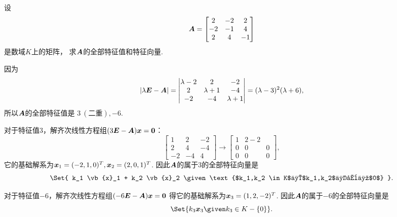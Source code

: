 \begin{example}
设\[
	\boldsymbol{A} = \begin{bmatrix}
		2 & -2 & 2 \\
		-2 & -1 & 4 \\
		2 & 4 & -1
	\end{bmatrix}
\]是数域\(K\)上的矩阵，
求\(\boldsymbol{A}\)的全部特征值和特征向量.
\begin{solution}
因为\[
	\abs{\lambda\boldsymbol{E}-\boldsymbol{A}}
	= \begin{vmatrix}
		\lambda-2 & 2 & -2 \\
		2 & \lambda+1 & -4 \\
		-2 & -4 & \lambda+1
	\end{vmatrix}
	= (\lambda-3)^2 (\lambda+6),
\]
所以\(\boldsymbol{A}\)的全部特征值是
\(3\ (\text{二重}),-6\).

对于特征值\(3\)，解齐次线性方程组\((3\boldsymbol{E}-\boldsymbol{A}) \boldsymbol{x} = \boldsymbol0\)：\[
	\begin{bmatrix}
		1 & 2 & -2 \\
		2 & 4 & -4 \\
		-2 & -4 & 4
	\end{bmatrix}
	\to \begin{bmatrix}
		1 & 2 -2 \\
		0 & 0 & 0 \\
		0 & 0 & 0
	\end{bmatrix},
\]
它的基础解系为\(\boldsymbol{x}_1 = (-2,1,0)^T,
\boldsymbol{x}_2 = (2,0,1)^T\).
因此\(\boldsymbol{A}\)的属于\(3\)的全部特征向量是\[
	\Set{
		k_1 \vb{x}_1 + k_2 \vb{x}_2
		\given
		\text{$k_1,k_2 \in K$且$k_1,k_2$不全为$0$}
	}.
\]

对于特征值\(-6\)，解齐次线性方程组\((-6\boldsymbol{E}-\boldsymbol{A}) \boldsymbol{x} = \boldsymbol0\)
得它的基础解系为\(\boldsymbol{x}_3 = (1,2,-2)^T\).
因此\(\boldsymbol{A}\)的属于\(-6\)的全部特征向量是\[
	\Set{
		k_3 \vb{x}_3
		\given
		k_3 \in K-\{0\}
	}.
\]
\end{solution}
\end{example}

